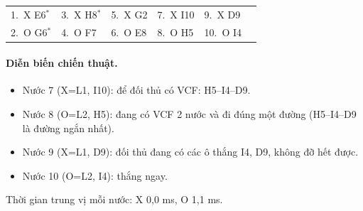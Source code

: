 {\footnotesize\linespread{1}\selectfont
\noindent\begin{tabularx}{\linewidth}{*{6}{X}}
\toprule
1.~X E6$^\ast$ & 3.~X H8$^\ast$ & 5.~X G2 & 7.~X I10 & 9.~X D9 &  \\
2.~O G6$^\ast$ & 4.~O F7 & 6.~O E8 & 8.~O H5 & 10.~O I4 &  \\
\bottomrule
\end{tabularx}\par}
\paragraph{Diễn biến chiến thuật.}
\begin{itemize}\footnotesize\linespread{1.1}\selectfont
\setlength{\itemsep}{0pt}
  \item Nước 7 (X=L1, I10): để đối thủ có VCF: H5--I4--D9.
  \item Nước 8 (O=L2, H5): đang có VCF 2 nước và đi đúng một đường (H5--I4--D9 là đường ngắn nhất).
  \item Nước 9 (X=L1, D9): đối thủ đang có các ô thắng I4, D9, không đỡ hết được.
  \item Nước 10 (O=L2, I4): thắng ngay.
\end{itemize}
Thời gian trung vị mỗi nước: X 0,0 ms, O 1,1 ms.
\clearpage

